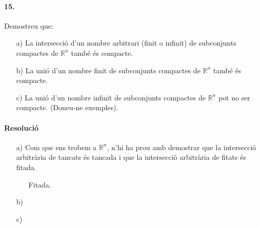\documentclass[11pt]{article}
\begin{document}
\paragraph{15.} Demostreu que:
\begin{itemize}
	\item[a)] La intersecció d'un nombre arbitrari (finit o infinit) de subconjunts compactes de $\mathbb{R}^n$ també és compacte.
	\item[b)] La unió d'un nombre finit de subconjunts compactes de $\mathbb{R}^n$ també és compacte.
	\item[c)] La unió d'un nombre infinit de subconjunts compactes de $\mathbb{R}^n$ pot no ser compacte. (Doneu-ne exemples).
\end{itemize}
\paragraph{Resolució}
\begin{itemize}
	\item[a)] Com que ens trobem a $\mathbb{R}^n$, n'hi ha prou amb demostrar que la intersecció arbitrària de tancats és tancada i que la intersecció arbitrària de fitats és fitada.
	\begin{itemize}
		\item[Fitada.]
	\end{itemize}
	\item[b)]
	\item[c)]
\end{itemize}
\end{document}
